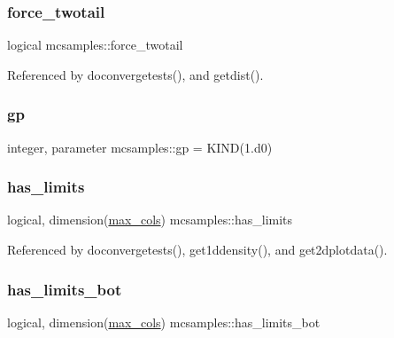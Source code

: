 \subsubsection{\texorpdfstring{force\+\_\+twotail}{force\_twotail}}
{\footnotesize\ttfamily logical mcsamples\+::force\+\_\+twotail}



Referenced by doconvergetests(), and getdist().

\mbox{\label{namespacemcsamples_a423ddd0f2de0560617b74a17231275e0}} 
\subsubsection{\texorpdfstring{gp}{gp}}
{\footnotesize\ttfamily integer, parameter mcsamples\+::gp = K\+I\+ND(1.d0)}

\mbox{\label{namespacemcsamples_ae802de51bb481b085361a661c090d461}} 
\subsubsection{\texorpdfstring{has\+\_\+limits}{has\_limits}}
{\footnotesize\ttfamily logical, dimension(\mbox{\hyperlink{namespacemcsamples_ae8386bad918d8af8d203683c01d5818c}{max\+\_\+cols}}) mcsamples\+::has\+\_\+limits}



Referenced by doconvergetests(), get1ddensity(), and get2dplotdata().

\mbox{\label{namespacemcsamples_af020921aecf16dd5008460d6a82fdd64}} 
\subsubsection{\texorpdfstring{has\+\_\+limits\+\_\+bot}{has\_limits\_bot}}
{\footnotesize\ttfamily logical, dimension(\mbox{\hyperlink{namespacemcsamples_ae8386bad918d8af8d203683c01d5818c}{max\+\_\+cols}}) mcsamples\+::has\+\_\+limits\+\_\+bot}



